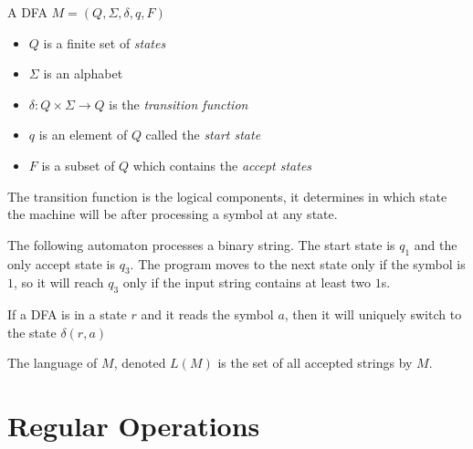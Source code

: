 \documentclass{article}
\begin{document}
A DFA \(M=(Q, \Sigma, \delta, q, F)\)
\begin{itemize}
    \item \(Q\) is a finite set of \textit{states}
    \item \(\Sigma\) is an alphabet
    \item \(\delta : Q \times \Sigma \to Q\) is the \textit{transition function}
    \item \(q\) is an element of \(Q\) called the \textit{start state}
    \item \(F\) is a subset of \(Q\) which contains the \textit{accept states}
\end{itemize}
The transition function is the logical components, it determines
in which state the machine will be after processing a symbol at any state.

The following automaton processes a binary string.
The start state is \(q_1\) and the only accept state is \(q_3\).
The program moves to the next state only if the symbol is \(1\),
so it will reach \(q_3\) only if the input string contains at least two \(1\)s.
\begin{center}
\end{center}


If a DFA is in a state \(r\) and it reads the symbol \(a\),
then it will uniquely switch to the state \(\delta(r, a)\)

\pagebreak

The language of \(M\), denoted \(L(M)\) is the set of all accepted strings
by \(M\).

\section{Regular Operations}
\end{document}
